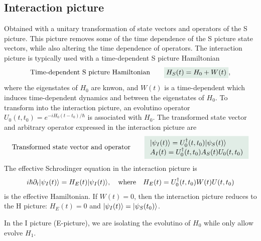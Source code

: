 \subsection{Interaction picture}
Obtained with a unitary transformation of state vectors and operators of the S picture.
This picture removes some of the time dependence of the S picture state vectors, while also altering the time dependence of operators. 
The interaction picture is typically used with a time-dependent S picture Hamiltonian 
\begin{align}
    \text{Time-dependent S picture Hamiltonian}\qquad\highlight{H_S(t)=H_0+W(t)},
\end{align}
where the eigenstates of $H_0$ are knwon, and $W(t)$ is a time-dependent  which induces time-dependent dynamics and 
between the eigenstates of $H_0$. To transform into the interaction picture, an evolutino operator $U_0(t,t_0)=e^{-iH_0(t-t_0)/\hbar}$ is associated with $H_0$.
The transformed state vector and arbitrary operator expressed in the interaction picture are 
\begin{align}
    \text{Transformed state vector and operator}\qquad\highlight{\begin{array}{l}
        \ket{\psi_I(t)}=U_0^\dagger(t,t_0)\ket{\psi_S(t)}\\
        A_I(t)=U^\dagger_0(t,t_0)A_S(t)U_0(t,t_0)
    \end{array}}
\end{align}
The effective Schrodinger equation in the interaction picture is 
\begin{align}
    i\hbar\partial_t|\psi_I(t)\rangle=H_E(t)|\psi_I(t)\rangle,\quad\text{where}\quad H_E(t)=U^\dagger_0(t,t_0)W(t)U(t,t_0)
\end{align}
is the effective Hamiltonian. If $W(t)=0$, then the interaction picture reduces to the H picture: $H_E(t)=0$ and $|\psi_I(t)\rangle=|\psi_S(t_0)\rangle$.
\begin{emphasizer}
    In the I picture (E-picture), we are isolating the evolutino of $H_0$ while only allow evolve $H_1$.
\end{emphasizer}